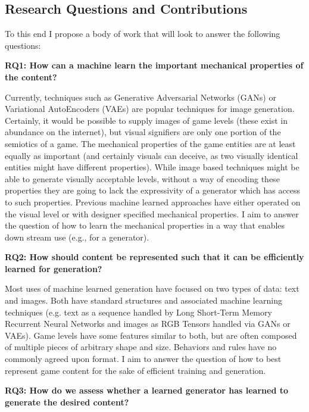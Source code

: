 \documentclass[12pt]{report}
\begin{document}
\subsection*{Research Questions and Contributions}

To this end I propose a body of work that will look to answer the following questions:

\textbf{RQ1: How can a machine learn the important mechanical properties of the content?}

Currently, techniques such as Generative Adversarial Networks (GANs) or Variational AutoEncoders (VAEs) are popular techniques for image generation.  Certainly, it would be possible to supply images of game levels (these exist in abundance on the internet\cite{vgatlas}), but visual signifiers are only one portion of the semiotics of a game.  The mechanical properties of the game entities are at least equally as important (and certainly visuals can deceive, as two visually identical entities might have different properties).  While image based techniques might be able to generate visually acceptable levels, without a way of encoding these properties they are going to lack the expressivity of a generator which has access to such properties.  Previous machine learned approaches have either operated on the visual level or with designer specified mechanical properties.   I aim to answer the question of how to learn the mechanical properties in a way that enables down stream use (e.g., for a generator).


\textbf{RQ2: How should content be represented such that it can be efficiently learned for generation?}

Most uses of machine learned generation have focused on two types of data: text and images.  Both have standard structures and associated machine learning techniques (e.g. text as a sequence handled by Long Short-Term Memory Recurrent Neural Networks and images as RGB Tensors handled via GANs or VAEs).  Game levels have some features similar to both, but are often composed of multiple pieces of arbitrary shape and size.  Behaviors and rules have no commonly agreed upon format.  I aim to answer the question of how to best represent game content for the sake of efficient training and generation.

\textbf{RQ3: How do we assess whether a learned generator has learned to generate the desired content?}
\end{document}
